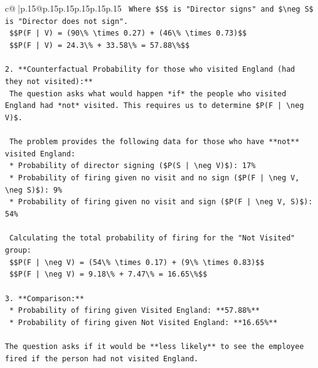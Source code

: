 \documentclass{article}
\begin{document}
{\begin{supertabular}{c@{$\;$}|p{.15\linewidth}@{}p{.15\linewidth}p{.15\linewidth}p{.15\linewidth}p{.15\linewidth}p{.15\linewidth}}
{{{\texttt{    Where \$S\$ is "Director signs" and \$\textbackslash{}neg S\$ is "Director does not sign".} \\
\texttt{    \$\$P(F | V) = (90\textbackslash{}\% \textbackslash{}times 0.27) + (46\textbackslash{}\% \textbackslash{}times 0.73)\$\$} \\
\texttt{    \$\$P(F | V) = 24.3\textbackslash{}\% + 33.58\textbackslash{}\% = 57.88\textbackslash{}\%\$\$} \\
\\ 
\texttt{2.  **Counterfactual Probability for those who visited England (had they not visited):**} \\
\texttt{    The question asks what would happen *if* the people who visited England had *not* visited. This requires us to determine \$P(F | \textbackslash{}neg V)\$.} \\
\\ 
\texttt{    The problem provides the following data for those who have **not** visited England:} \\
\texttt{    *   Probability of director signing (\$P(S | \textbackslash{}neg V)\$): 17\%} \\
\texttt{    *   Probability of firing given no visit and no sign (\$P(F | \textbackslash{}neg V, \textbackslash{}neg S)\$): 9\%} \\
\texttt{    *   Probability of firing given no visit and sign (\$P(F | \textbackslash{}neg V, S)\$): 54\%} \\
\\ 
\texttt{    Calculating the total probability of firing for the "Not Visited" group:} \\
\texttt{    \$\$P(F | \textbackslash{}neg V) = (54\textbackslash{}\% \textbackslash{}times 0.17) + (9\textbackslash{}\% \textbackslash{}times 0.83)\$\$} \\
\texttt{    \$\$P(F | \textbackslash{}neg V) = 9.18\textbackslash{}\% + 7.47\textbackslash{}\% = 16.65\textbackslash{}\%\$\$} \\
\\ 
\texttt{3.  **Comparison:**} \\
\texttt{    *   Probability of firing given Visited England: **57.88\%**} \\
\texttt{    *   Probability of firing given Not Visited England: **16.65\%**} \\
\\ 
\texttt{The question asks if it would be **less likely** to see the employee fired if the person had not visited England.} \\
}}}
\end{supertabular}}
\end{document}
